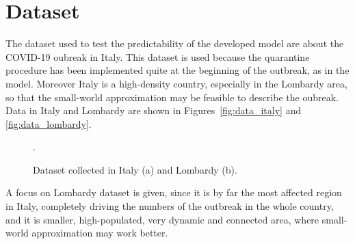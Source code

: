 \section{Dataset}

The dataset used to test the predictability of the developed model are about the COVID-19 oubreak in Italy. This dataset is used because the quarantine procedure has been implemented quite at the beginning of the outbreak, as in the model. Moreover Italy is a high-density country, especially in the Lombardy area, so that the small-world approximation may be feasible to describe the oubreak. Data in Italy and Lombardy are shown in Figures~\ref{fig:data_italy} and \ref{fig:data_lombardy}.\\

\begin{figure}[!ht]\centering
{}

\caption{Dataset collected in Italy (a) and Lombardy (b).}.
\end{figure}

A focus on Lombardy dataset is given, since it is by far the most affected region in Italy, completely driving the numbers of the outbreak in the whole country, and it is smaller, high-populated, very dynamic and connected area, where small-world approximation may work better.